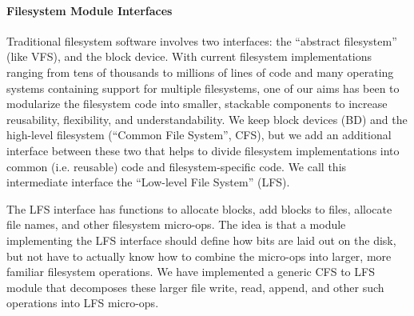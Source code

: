 \paragraph{Filesystem Module Interfaces}
\label{sec:interfaces}

Traditional filesystem software involves two interfaces: the ``abstract
filesystem'' (like VFS), and the block device. With current filesystem
implementations ranging from tens of thousands to millions of lines of code
and many operating systems containing support for multiple filesystems, one of
our aims has been to modularize the filesystem code into smaller, stackable
components to increase reusability, flexibility, and understandability. We
keep block devices (BD) and the high-level filesystem (``Common File System'',
CFS), but we add an additional interface between these two that helps to
divide filesystem implementations into common (i.e. reusable) code and
filesystem-specific code. We call this intermediate interface the ``Low-level
File System'' (LFS).

The LFS interface has functions to allocate blocks, add blocks to files,
allocate file names, and other filesystem micro-ops. The idea is that a module
implementing the LFS interface should define how bits are laid out on the
disk, but not have to actually know how to combine the micro-ops into larger,
more familiar filesystem operations. We have implemented a generic CFS to LFS
module that decomposes these larger file write, read, append, and other such
operations into LFS micro-ops.
